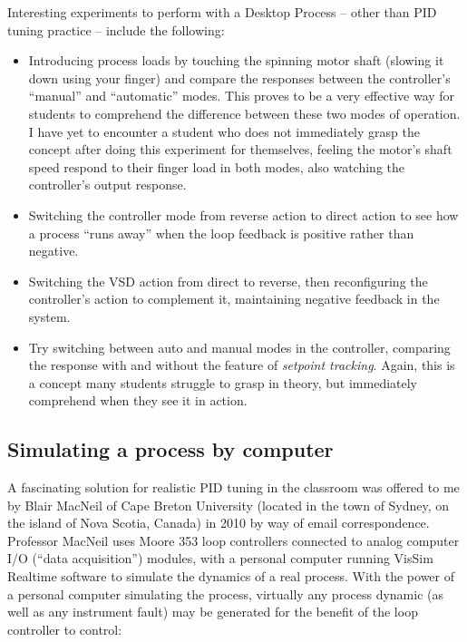 \vskip 10pt

Interesting experiments to perform with a Desktop Process -- other than PID tuning practice -- include the following:

\begin{itemize}
\item Introducing process loads by touching the spinning motor shaft (slowing it down using your finger) and compare the responses between the controller's ``manual'' and ``automatic'' modes.  This proves to be a very effective way for students to comprehend the difference between these two modes of operation.  I have yet to encounter a student who does not immediately grasp the concept after doing this experiment for themselves, feeling the motor's shaft speed respond to their finger load in both modes, also watching the controller's output response.
\item Switching the controller mode from reverse action to direct action to see how a process ``runs away'' when the loop feedback is positive rather than negative.
\item Switching the VSD action from direct to reverse, then reconfiguring the controller's action to complement it, maintaining negative feedback in the system.
\item Try switching between auto and manual modes in the controller, comparing the response with and without the feature of \textit{setpoint tracking}.  Again, this is a concept many students struggle to grasp in theory, but immediately comprehend when they see it in action.
\end{itemize}



\filbreak
\subsection{Simulating a process by computer}

A fascinating solution for realistic PID tuning in the classroom was offered to me by Blair MacNeil of Cape Breton University (located in the town of Sydney, on the island of Nova Scotia, Canada) in 2010 by way of email correspondence.  Professor MacNeil uses Moore 353 loop controllers connected to analog computer I/O (``data acquisition'') modules, with a personal computer running VisSim Realtime software to simulate the dynamics of a real process.  With the power of a personal computer simulating the process, virtually any process dynamic (as well as any instrument fault) may be generated for the benefit of the loop controller to control:    

